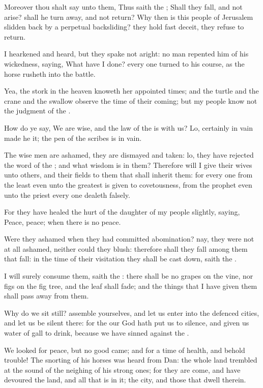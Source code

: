 \Verse Moreover thou shalt say unto them, Thus saith the \LORD; Shall they fall, and not arise? shall he turn away, and not return?  \Verse Why then is this people of Jerusalem slidden back by a perpetual backsliding?  they hold fast deceit, they refuse to return.

\Verse I hearkened and heard, but they spake not aright: no man repented him of his wickedness, saying, What have I done? every one turned to his course, as the horse rusheth into the battle.

\Verse Yea, the stork in the heaven knoweth her appointed times; and the turtle and the crane and the swallow observe the time of their coming; but my people know not the judgment of the \LORD.

\Verse How do ye say, We are wise, and the law of the \LORD is with us?  Lo, certainly in vain made he it; the pen of the scribes is in vain.

\Verse The wise men are ashamed, they are dismayed and taken: lo, they have rejected the word of the \LORD; and what wisdom is in them?  \Verse Therefore will I give their wives unto others, and their fields to them that shall inherit them: for every one from the least even unto the greatest is given to covetousness, from the prophet even unto the priest every one dealeth falsely.

\Verse For they have healed the hurt of the daughter of my people slightly, saying, Peace, peace; when there is no peace.

\Verse Were they ashamed when they had committed abomination? nay, they were not at all ashamed, neither could they blush: therefore shall they fall among them that fall: in the time of their visitation they shall be cast down, saith the \LORD.

\Verse I will surely consume them, saith the \LORD: there shall be no grapes on the vine, nor figs on the fig tree, and the leaf shall fade; and the things that I have given them shall pass away from them.

\Verse Why do we sit still? assemble yourselves, and let us enter into the defenced cities, and let us be silent there: for the \LORD our God hath put us to silence, and given us water of gall to drink, because we have sinned against the \LORD.

\Verse We looked for peace, but no good came; and for a time of health, and behold trouble!  \Verse The snorting of his horses was heard from Dan: the whole land trembled at the sound of the neighing of his strong ones; for they are come, and have devoured the land, and all that is in it; the city, and those that dwell therein.

